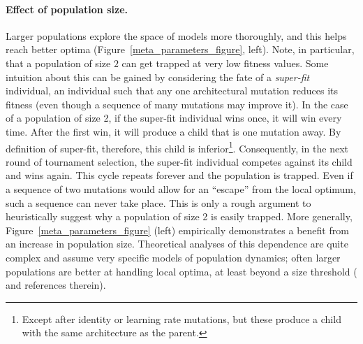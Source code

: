 \documentclass{article}
\begin{document}
\vspace{-1em}
\paragraph{Effect of population size.} Larger populations explore the space of models more thoroughly, and this helps reach better optima (Figure~\ref{meta_parameters_figure}, left). Note, in particular, that a population of size $2$ can get trapped at very low fitness values. Some intuition about this can be gained by considering the fate of a {\em super-fit} individual, \ie an individual such that any one architectural mutation reduces its fitness (even though a sequence of many mutations may improve it). In the case of a population of size 2, if the super-fit individual wins once, it will win every time. After the first win, it will produce a child that is one mutation away. By definition of super-fit, therefore, this child is inferior\footnote{Except after identity or learning rate mutations, but these produce a child with the same architecture as the parent.}. Consequently, in the next round of tournament selection, the super-fit individual competes against its child and wins again. This cycle repeats forever and the population is trapped. Even if a sequence of two mutations would allow for an ``escape'' from the local optimum, such a sequence can never take place. This is only a rough argument to heuristically suggest why a population of size 2 is easily trapped. More generally, Figure~\ref{meta_parameters_figure} (left) empirically demonstrates a benefit from an increase in population size. Theoretical analyses of this dependence are quite complex and assume very specific models of population dynamics; often larger populations are better at handling local optima, at least beyond a size threshold (\citet{weinreich2005rapid} and references therein).
\end{document}
